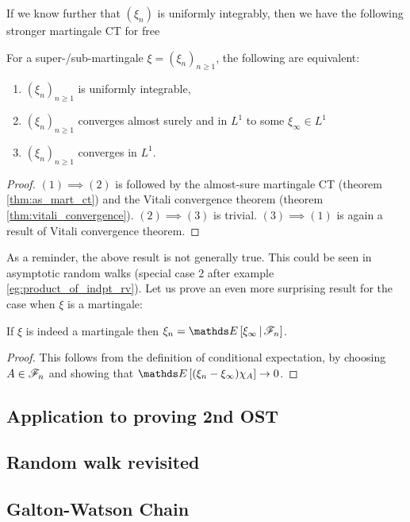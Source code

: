 If we know further that $(\xi_n)$ is uniformly integrably, then we have the following stronger martingale CT for free
\begin{corollary}
For a super-/sub-martingale $\xi=(\xi_n)_{n\geq 1}$, the following are equivalent:
\begin{enumerate}
    \item $(\xi_n)_{n\geq 1}$ is uniformly integrable,
    \item $(\xi_n)_{n\geq 1}$ converges almost surely and in $L^1$ to some $\xi_\infty \in L^1$
    \item $(\xi_n)_{n\geq 1}$ converges in $L^1$.
\end{enumerate}
\end{corollary}

\begin{proof}
$(1) \implies (2)$ is followed by the almost-sure martingale CT (theorem \ref{thm:as_mart_ct}) and the Vitali convergence theorem (theorem \ref{thm:vitali_convergence}). $(2) \implies (3)$ is trivial. $(3) \implies (1)$ is again a result of Vitali convergence theorem.
\end{proof}

As a reminder, the above result is not generally true. This could be seen in asymptotic random walks (special case 2 after example \ref{eg:product_of_indpt_rv}). Let us prove an even more surprising result for the case when $\xi$ is a martingale:
\begin{corollary}
If $\xi$ is indeed a martingale then $\xi_n = \E\sqbracket{\xi_\infty \,|\, \F_n}$.
\end{corollary}
\begin{proof}
This follows from the definition of conditional expectation, by choosing $A \in \mathcal{F}_n$ and showing that $\E\sqbracket{(\xi_n-\xi_\infty)\chi_A} \to 0$.
\end{proof}


\subsection{Application to proving 2nd OST}

\subsection{Random walk revisited}

\subsection{Galton-Watson Chain}

